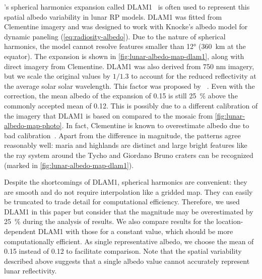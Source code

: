 \citeauthor{Floberghagen1999}'s  spherical harmonics expansion called \gls{DLAM1}~\cite{Floberghagen1999} is often used to represent this spatial albedo variability in lunar \gls{RP} models. \gls{DLAM1} was fitted from Clementine imagery and was designed to work with Knocke's albedo model for dynamic paneling (\cref{eq:radiosity-albedo}). Due to the nature of spherical harmonics, the model cannot resolve features smaller than \ang{12} (\qty{360}{\km} at the equator). The expansion is shown in \cref{fig:lunar-albedo-map-dlam1}, along with direct imagery from Clementine. \gls{DLAM1} was also derived from 750 nm imagery, but we scale the original values by $1/1.3$ to account for the reduced reflectivity at the average solar solar wavelength. This factor was proposed by \citeauthor{Vasavada2012}~\cite{Vasavada2012}. Even with the correction, the mean albedo of the expansion of 0.15 is still \qty{25}{\percent} above the commonly accepted mean of 0.12. This is possibly due to a different calibration of the imagery that \gls{DLAM1} is based on compared to the mosaic from \cref{fig:lunar-albedo-map-photo}. In fact, Clementine is known to overestimate albedo due to bad calibration~\cite{Shkuratov2011}. Apart from the difference in magnitude, the patterns agree reasonably well: maria and highlands are distinct and large bright features like the ray system around the Tycho and Giordano Bruno craters can be recognized (marked in \cref{fig:lunar-albedo-map-dlam1}).

Despite the shortcomings of \gls{DLAM1}, spherical harmonics are convenient: they are smooth and do not require interpolation like a gridded map. They can easily be truncated to trade detail for computational efficiency. Therefore, we used \gls{DLAM1} in this paper but consider that the magnitude may be overestimated by \qty{25}{\percent} during the analysis of results. We also compare results for the location-dependent \gls{DLAM1} with those for a constant value, which should be more computationally efficient. As single representative albedo, we choose the mean of 0.15 instead of 0.12 to facilitate comparison. Note that the spatial variability described above suggests that a single albedo value cannot accurately represent lunar reflectivity.


